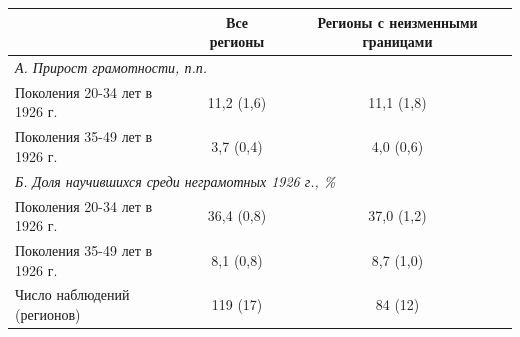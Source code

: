\begin{tabular}{lcc}
\toprule
 & Все регионы & Регионы с неизменными границами \\
\midrule
\multicolumn{3}{l}{\textit{А. Прирост грамотности, п.п.}} \\
Поколения 20-34 лет в 1926 г. & 11,2 (1,6) & 11,1 (1,8) \\
Поколения 35-49 лет в 1926 г. & 3,7 (0,4) & 4,0 (0,6) \\
\multicolumn{3}{l}{\textit{Б. Доля научившихся среди неграмотных 1926 г., \%}} \\
Поколения 20-34 лет в 1926 г. & 36,4 (0,8) & 37,0 (1,2) \\
Поколения 35-49 лет в 1926 г. & 8,1 (0,8) & 8,7 (1,0) \\
\midrule
Число наблюдений (регионов) & 119 (17) & 84 (12) \\
\bottomrule
\end{tabular}

